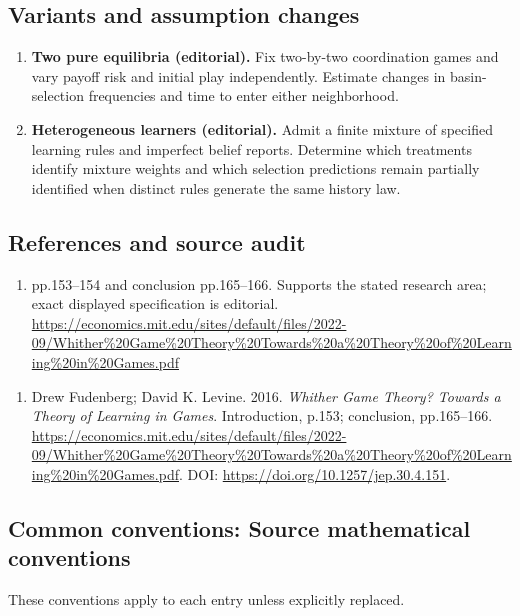 \documentclass[11pt,a4paper]{article}
\begin{document}
\subsection*{Variants and assumption changes}
\begin{enumerate}
\item \textbf{Two pure equilibria (editorial).} Fix two-by-two coordination games and vary payoff risk and initial play independently. Estimate changes in basin-selection frequencies and time to enter either neighborhood.
\item \textbf{Heterogeneous learners (editorial).} Admit a finite mixture of specified learning rules and imperfect belief reports. Determine which treatments identify mixture weights and which selection predictions remain partially identified when distinct rules generate the same history law.
\end{enumerate}
\subsection*{References and source audit}
\begin{enumerate}
\item pp.153–154 and conclusion pp.165–166. Supports the stated research area; exact displayed specification is editorial. \url{https://economics.mit.edu/sites/default/files/2022-09/Whither%20Game%20Theory%20Towards%20a%20Theory%20of%20Learning%20in%20Games.pdf}
\end{enumerate}
\begin{enumerate}\raggedright
\item\hypertarget{definitions:source:30007563:1}{} Drew Fudenberg; David K. Levine. 2016. \emph{Whither Game Theory? Towards a Theory of Learning in Games}. Introduction, p.153; conclusion, pp.165–166.
\url{https://economics.mit.edu/sites/default/files/2022-09/Whither%20Game%20Theory%20Towards%20a%20Theory%20of%20Learning%20in%20Games.pdf}.
DOI: \url{https://doi.org/10.1257/jep.30.4.151}.
\end{enumerate}

\subsection*{Common conventions: Source mathematical conventions}

These conventions apply to each entry unless explicitly replaced.
\end{document}
